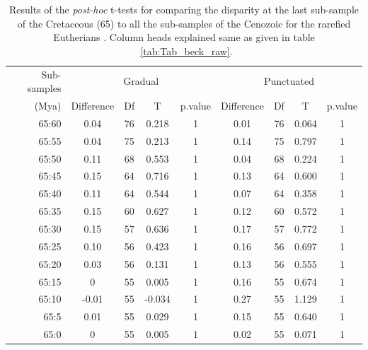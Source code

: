 \documentclass[12pt,letterpaper]{article}
\begin{document}
\begin{table}[ht]
\caption{Results of the \textit{post-hoc} t-tests for comparing the disparity at the last sub-sample of the Cretaceous (65) to all the sub-samples of the Cenozoic for the rarefied Eutherians \citep[data from][]{beckancient2014}. Column heads explained same as given in table ~\ref{tab:Tab_beck_raw}.}
\label{tab:Tab_beck_rar}
\centering
\begin{tabular}{r|cccc|cccc}
  \hline
  Sub-samples & \multicolumn{4}{c|}{Gradual} & \multicolumn{4}{c}{Punctuated} \\
  (Mya) & Difference & Df & T & p.value & Difference & Df & T & p.value \\ 
  \hline
  65:60 & 0.04  & 76 & 0.218  & 1 & 0.01 & 76 & 0.064 & 1 \\ 
  65:55 & 0.04  & 75 & 0.213  & 1 & 0.14 & 75 & 0.797 & 1 \\ 
  65:50 & 0.11  & 68 & 0.553  & 1 & 0.04 & 68 & 0.224 & 1 \\ 
  65:45 & 0.15  & 64 & 0.716  & 1 & 0.13 & 64 & 0.600 & 1 \\ 
  65:40 & 0.11  & 64 & 0.544  & 1 & 0.07 & 64 & 0.358 & 1 \\ 
  65:35 & 0.15  & 60 & 0.627  & 1 & 0.12 & 60 & 0.572 & 1 \\ 
  65:30 & 0.15  & 57 & 0.636  & 1 & 0.17 & 57 & 0.772 & 1 \\ 
  65:25 & 0.10  & 56 & 0.423  & 1 & 0.16 & 56 & 0.697 & 1 \\ 
  65:20 & 0.03  & 56 & 0.131  & 1 & 0.13 & 56 & 0.555 & 1 \\ 
  65:15 & 0     & 55 & 0.005  & 1 & 0.16 & 55 & 0.674 & 1 \\ 
  65:10 & -0.01 & 55 & -0.034 & 1 & 0.27 & 55 & 1.129 & 1 \\ 
  65:5  & 0.01  & 55 & 0.029  & 1 & 0.15 & 55 & 0.640 & 1 \\ 
  65:0  & 0     & 55 & 0.005  & 1 & 0.02 & 55 & 0.071 & 1 \\
   \hline
\end{tabular}
\end{table}
\end{document}
